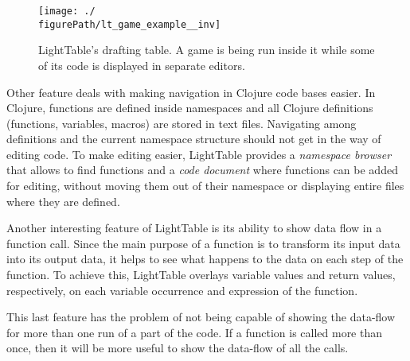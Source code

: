 \begin{figure}
  \centering
  \texttt{[image: ./\\figurePath/lt\_game\_example\_\_inv]}
  \caption[LightTable's drafting table showing a game.]{LightTable's drafting table. A game is being run inside it while some of its code is displayed in separate editors.}
  \label{fig:lt:draft:table}
\end{figure}

Other feature deals with making navigation in Clojure code bases easier.
In Clojure, functions are defined inside namespaces and all Clojure definitions (functions, variables, macros) are stored in text files.
Navigating among definitions and the current namespace structure should not get in the way of editing code.
To make editing easier, LightTable provides a \emph{namespace browser} that allows to find functions and a \emph{code document} where functions can be added for editing, without moving them out of their namespace or displaying entire files where they are defined.


Another interesting feature of LightTable is its ability to show data flow in a function call.
Since the main purpose of a function is to transform its input data into its output data, it helps to see what happens to the data on each step of the function.
To achieve this, LightTable overlays variable values and return values, respectively, on each variable occurrence and expression of the function.

This last feature has the problem of not being capable of showing the data-flow for more than one run of a part of the code.
If a function is called more than once, then it will be more useful to show the data-flow of all the calls.


